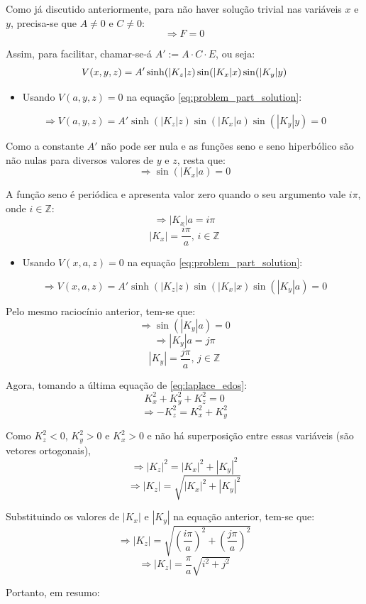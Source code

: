 \documentclass{report}
\begin{document}
Como já discutido anteriormente, para não haver solução trivial nas variáveis $ x $ e $ y $, precisa-se que $ A \neq 0 $ e $ C \neq 0 $:
$$ \Rightarrow F = 0 $$

Assim, para facilitar, chamar-se-á $ A' := A\cdot C\cdot E $, ou seja:
\begin{equation}
    \label{eq:problem_part_solution}
    \centering
    V(x, y, z) = A'\sinh(|K_z|z)\sin(|K_x|x)\sin(|K_y|y)
\end{equation}

\begin{itemize}
  \item Usando $ V(a, y, z) = 0 $ na equação \ref{eq:problem_part_solution}:
\end{itemize}
$$ \Rightarrow V(a, y, z) = A'\sinh(|K_z|z)\sin(|K_x|a)\sin(|K_y|y) = 0 $$

Como a constante $ A' $ não pode ser nula e as funções seno e seno hiperbólico são não nulas para diversos valores de $ y $ e $ z $, resta que:
$$ \Rightarrow \sin(|K_x|a) = 0 $$

A função seno é periódica e apresenta valor zero quando o seu argumento vale $ i\pi $, onde $ i \in \mathbb{Z} $:
$$ \Rightarrow |K_x|a = i\pi $$
$$ |K_x| = \frac{i\pi}{a},\, i \in \mathbb{Z} $$

\begin{itemize}
  \item Usando $ V(x, a, z) = 0 $ na equação \ref{eq:problem_part_solution}:
\end{itemize}
$$ \Rightarrow V(x, a, z) = A'\sinh(|K_z|z)\sin(|K_x|x)\sin(|K_y|a) = 0 $$

Pelo mesmo raciocínio anterior, tem-se que:
$$ \Rightarrow \sin(|K_y|a) = 0 $$
$$ \Rightarrow |K_y|a = j\pi $$
$$ |K_y| = \frac{j\pi}{a},\, j \in \mathbb{Z} $$

Agora, tomando a última equação de \ref{eq:laplace_edos}:
$$ K_x^2 + K_y^2 + K_z^2 = 0 $$
$$ \Rightarrow -K_z^2 = K_x^2 + K_y^2 $$

Como $ K_z^2 < 0 $, $ K_y^2 > 0 $ e $ K_x^2 > 0 $ e não há superposição entre essas variáveis (são vetores ortogonais),
$$ \Rightarrow |K_z|^2 = |K_x|^2 + |K_y|^2 $$
$$ \Rightarrow |K_z| = \sqrt{|K_x|^2 + |K_y|^2} $$

Substituindo os valores de $ |K_x| $ e $ |K_y| $ na equação anterior, tem-se que:
$$ \Rightarrow |K_z| = \sqrt{\left(\frac{i\pi}{a}\right)^2 + \left(\frac{j\pi}{a}\right)^2} $$
$$ \Rightarrow |K_z| = \frac{\pi}{a}\sqrt{i^2 + j^2} $$

Portanto, em resumo:
\end{document}
